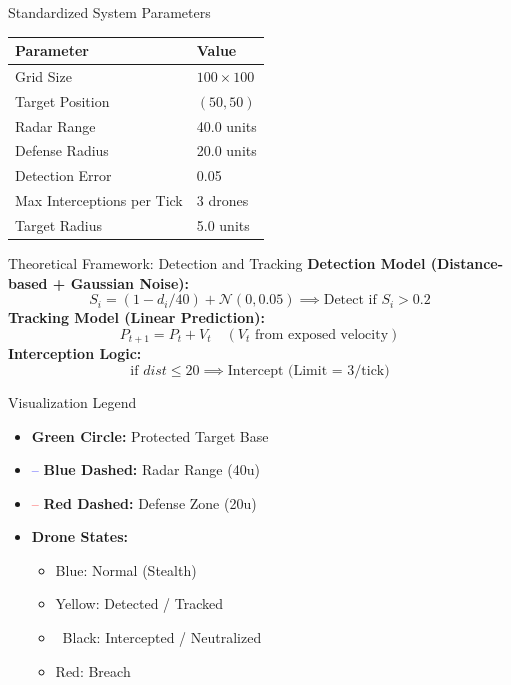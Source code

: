 \documentclass{beamer}
\begin{document}
\begin{frame}{Standardized System Parameters}
    \begin{table}
        \centering
        \begin{tabular}{|l|l|}
            \hline
            \textbf{Parameter} & \textbf{Value} \\
            \hline
            Grid Size & $100 \times 100$ \\
            Target Position & $(50, 50)$ \\
            Radar Range & 40.0 units \\
            Defense Radius & 20.0 units \\
            Detection Error & 0.05 \\
            Max Interceptions per Tick & 3 drones \\
            Target Radius & 5.0 units \\
            \hline
        \end{tabular}
    \end{table}
\end{frame}

\begin{frame}{Theoretical Framework: Detection and Tracking}
    \textbf{Detection Model (Distance-based + Gaussian Noise):}
    \[ S_i = (1 - d_i/40) + \mathcal{N}(0, 0.05) \implies \text{Detect if } S_i > 0.2 \]
    \vspace{0.3cm}
    \textbf{Tracking Model (Linear Prediction):}
    \[ P_{t+1} = P_t + V_t \quad (V_t \text{ from exposed velocity}) \]
    \vspace{0.3cm}
    \textbf{Interception Logic:}
    \[ \text{if } dist \le 20 \implies \text{Intercept (Limit = 3/tick)} \]
\end{frame}

\begin{frame}{Visualization Legend}
    \begin{itemize}
        \item \textcolor{green}{\textbullet} \textbf{Green Circle:} Protected Target Base
        \item \textcolor{blue}{--} \textbf{Blue Dashed:} Radar Range (40u)
        \item \textcolor{red}{--} \textbf{Red Dashed:} Defense Zone (20u)
        \item \textbf{Drone States:}
        \begin{itemize}
            \item \textcolor{blue}{\textbullet} Blue: Normal (Stealth)
            \item \textcolor{yellow}{\textbullet} Yellow: Detected / Tracked
            \item \textbullet \ Black: Intercepted / Neutralized
            \item \textcolor{red}{\textbullet} Red: Breach
        \end{itemize}
    \end{itemize}
\end{frame}
\end{document}
